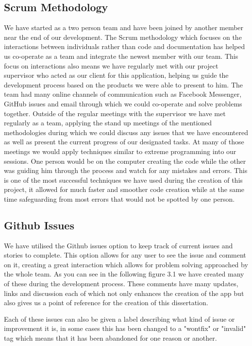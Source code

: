   \subsection{Scrum Methodology} 
  We have started as a two person team and have been joined by another member near the end of our development. The Scrum methodology which focuses on the interactions between 
  individuals rather than code and documentation has helped us co-operate as a team and integrate the newest member with our team. 
  This focus on interactions also means we have regularly met with our project supervisor who acted as our client for this application, helping us guide the 
  development process based on the products we were able to present to him. 
  The team had many online channels of communication such as Facebook Messenger, GitHub issues and email through which we could co-operate and solve problems together. 
  Outside of the regular meetings with the supervisor we have met regularly as a team, applying the stand up meetings of the mentioned methodologies during which 
  we could discuss any issues that we have encountered as well as present the current progress of our designated tasks. 
  At many of those meetings we would apply techniques similar to extreme programming into our sessions\cite{scrum}. 
  One person would be on the computer creating the code while the other was guiding him through the process and watch for any mistakes and errors. 
  This is one of the most successful techniques we have used during the creation of this project, it allowed for much faster and smoother code creation while 
  at the same time safeguarding from most errors that would not be spotted by one person.
    
    \subsection{Github Issues}
    We have utilised the Github issues option to keep track of current issues and stories to complete. This option allows for any user to see the issue and comment on it, creating a great interaction which allows for problem solving approached by the whole team. As you can see in the following figure 3.1 we have created many of these during the development process. These comments have many updates, links and discussion each of which not only enhances the creation of the app but also gives us a point of reference for the creation of this dissertation.
    
    Each of these issues can also be given a label describing what kind of issue or improvement it is, in some cases this has been changed to a "wontfix" or "invalid" tag which means that it has been abandoned for one reason or another.
        
